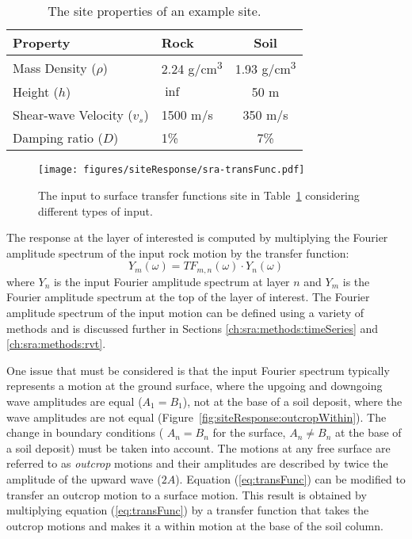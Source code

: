 \documentclass[12pt,oneside]{book}
\begin{document}
\begin{table}[t]
    \centering
    \begin{tabular}{llc}
        \hline\hline
        \textbf{Property} & \textbf{Rock} & \textbf{Soil} \\
        \hline
        Mass Density ($\rho$)  & 2.24 g/cm\textsuperscript{3} & 1.93 g/cm\textsuperscript{3} \\
        Height ($h$) & $\inf$ & 50 m \\
        Shear-wave Velocity ($v_s$) & 1500 m/s & 350 m/s \\
        Damping ratio ($D$) & 1\% & 7\% \\
        \hline
    \end{tabular}
    \caption{The site properties of an example site.}
    \label{tab:siteResponse:site}
\end{table}
\begin{figure}[t]
    \begin{center}
        \texttt{[image: figures/siteResponse/sra-transFunc.pdf]}
    \end{center}
    \caption{The input to surface transfer functions site in Table~\ref{tab:siteResponse:site}
    considering different types of input.}
    \label{fig:siteResponse:transFunc}
\end{figure}


The response at the layer of interested is computed by multiplying the Fourier amplitude spectrum of the
input rock motion by the transfer function:
\begin{equation}
    Y_m(\omega) = TF_{m,n}(\omega) \cdot Y_n(\omega)
    \label{eq:tfApplication}
\end{equation}
where $Y_n$ is the input Fourier amplitude spectrum at layer $n$ and $Y_m$ is the Fourier amplitude
spectrum at the top of the layer of interest.  The Fourier amplitude spectrum of the input motion
can be defined using a variety of methods and is discussed further in Sections
\ref{ch:sra:methods:timeSeries} and \ref{ch:sra:methods:rvt}.

One issue that must be considered is that the input Fourier spectrum typically represents a motion
at the ground surface, where the upgoing and downgoing wave amplitudes are equal ($A_1=B_1$), not at
the base of a soil deposit, where the wave amplitudes are not equal
(Figure~\ref{fig:siteResponse:outcropWithin}). The change in boundary conditions ( $A_n = B_n$ for
the surface, $A_n \ne B_n$ at the base of a soil deposit) must be taken into account.  The motions
at any free surface are referred to as \emph{outcrop} motions and their
amplitudes are described by twice the amplitude of the upward wave ($2A$).  Equation
(\ref{eq:transFunc}) can be modified to transfer an outcrop motion to a surface motion.  This result
is obtained by multiplying equation (\ref{eq:transFunc}) by a transfer function that takes the
outcrop motions and makes it a within motion at the base of the soil column.
\end{document}
